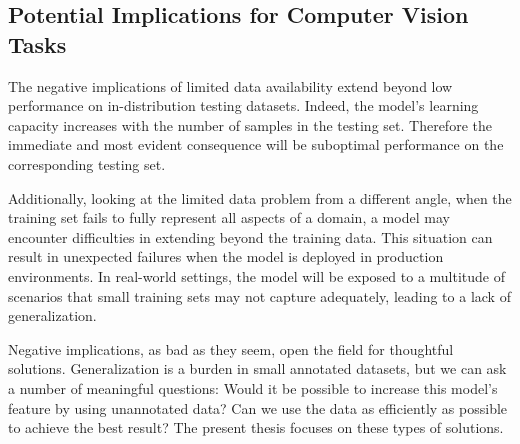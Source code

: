\subsection{Potential Implications for Computer Vision Tasks}
The negative implications of limited data availability extend beyond low performance on in-distribution testing datasets. Indeed, the model's learning capacity increases with the number of samples in the testing set. Therefore the immediate and most evident consequence will be suboptimal performance on the corresponding testing set.

Additionally, looking at the limited data problem from a different angle, when the training set fails to fully represent all aspects of a domain, a model may encounter difficulties in extending beyond the training data. This situation can result in unexpected failures when the model is deployed in production environments. In real-world settings, the model will be exposed to a multitude of scenarios that small training sets may not capture adequately, leading to a lack of generalization.

Negative implications, as bad as they seem, open the field for thoughtful solutions. Generalization is a burden in small annotated datasets, but we can ask a number of meaningful questions: Would it be possible to increase this model's feature by using unannotated data? Can we use the data as efficiently as possible to achieve the best result? The present thesis focuses on these types of solutions.